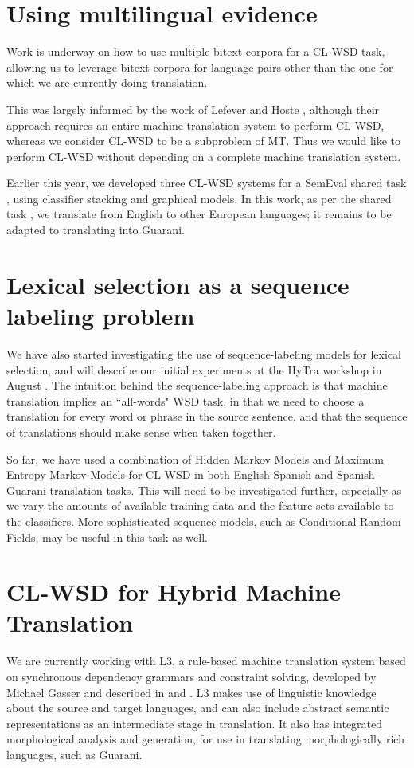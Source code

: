 \documentclass{article}
\begin{document}
\section{Using multilingual evidence}
Work is underway on how to use multiple bitext corpora for a CL-WSD task,
allowing us to leverage bitext corpora for language pairs other than the one
for which we are currently doing translation.

This was largely informed by the work of Lefever and Hoste
\cite{lefever-hoste-decock:2011:ACL-HLT2011}, although their approach requires
an entire machine translation system to perform CL-WSD, whereas we consider
CL-WSD to be a subproblem of MT. Thus we would like to perform CL-WSD without
depending on a complete machine translation system.

Earlier this year, we developed three CL-WSD systems for a SemEval shared task
\cite{rudnick-liu-gasser:2013:SemEval-2013}, using classifier stacking and
graphical models. In this work, as per the shared task \cite{task10}, we
translate from English to other European languages; it remains to be adapted to
translating into Guarani.

\section{Lexical selection as a sequence labeling problem}
We have also started investigating the use of sequence-labeling models for
lexical selection, and will describe our initial experiments at the HyTra
workshop in August \cite{rudnick-gasser:2013:HyTra-2013}. The intuition behind
the sequence-labeling approach is that machine translation implies an
``all-words" WSD task, in that we need to choose a translation for every word
or phrase in the source sentence, and that the sequence of translations should
make sense when taken together.

So far, we have used a combination of Hidden Markov Models and Maximum Entropy
Markov Models for CL-WSD in both English-Spanish and Spanish-Guarani
translation tasks. This will need to be investigated further, especially as we
vary the amounts of available training data and the feature sets available to
the classifiers. More sophisticated sequence models, such as Conditional Random
Fields, may be useful in this task as well.

\section{CL-WSD for Hybrid Machine Translation}
We are currently working with L3, a rule-based machine translation system based
on synchronous dependency grammars and constraint solving, developed by Michael
Gasser and described in  \cite{gasser:sxdg} and \cite{gasser:aflat2012}. L3
makes use of linguistic knowledge about the source and target languages, and
can also include abstract semantic representations as an intermediate stage in
translation. It also has integrated morphological analysis and generation, for
use in translating morphologically rich languages, such as Guarani.
\end{document}
